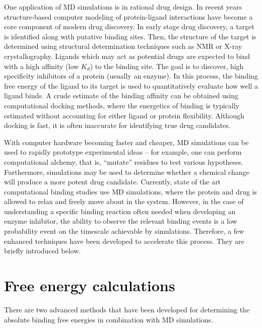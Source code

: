 

One application of MD simulations is in rational drug design. In recent years structure-based computer modeling of protein-ligand interactions have become a core component of modern drug discovery.  In early stage drug discovery, a target is identified along with putative binding sites.  Then, the structure of the target is determined using structural determination techniques such as NMR or X-ray crystallography.
Ligands which may act as potential drugs are expected to bind with a high affinity (low $K_d$) to the binding site. The goal is to discover,  high specificity inhibitors of a protein (usually an enzyme). In this process, the binding free energy of the ligand to its target is used to quantitatively evaluate how well a ligand binds. A crude estimate of the binding affinity can be obtained using computational docking methods, where the energetics of binding is typically estimated without accounting for either ligand or protein flexibility.  Although docking is fast, it is often inaccurate for identifying true drug candidates.

With computer hardware becoming faster and cheaper, MD simulations can be used to rapidly prototype experimental ideas -- for example, one can perform computational alchemy, that is, ``mutate'' residues to test various hypotheses. Furthermore, simulations may be used to determine whether a chemical change will produce a more potent drug candidate. Currently, state of the art computational binding studies use MD simulations, where the protein and drug is allowed to relax and freely move about in the system. However, in the case of understanding a specific binding reaction often needed when developing an enzyme inhibitor, the ability to observe the relevant binding events is a low probability event on the timescale achievable by simulations. Therefore, a few enhanced techniques have been developed to accelerate this process.  They are briefly introduced below.

\section{Free energy calculations}
There are two advanced methods that have been developed for determining the absolute binding free energies in combination with MD simulations.

